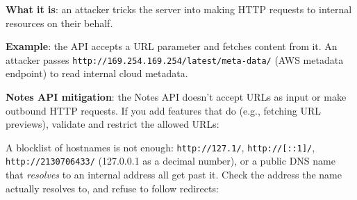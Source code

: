 \textbf{What it is}: an attacker tricks the server into making HTTP requests to internal resources on their behalf.

\textbf{Example}: the API accepts a URL parameter and fetches content from it. An attacker passes \texttt{http:}\allowbreak{}\texttt{/}\allowbreak{}\texttt{/}\allowbreak{}\texttt{169.}\allowbreak{}\texttt{254.}\allowbreak{}\texttt{169.}\allowbreak{}\texttt{254/}\allowbreak{}\texttt{latest/}\allowbreak{}\texttt{meta-}\allowbreak{}\texttt{data/} (AWS metadata endpoint) to read internal cloud metadata.

\textbf{Notes API mitigation}: the Notes API doesn't accept URLs as input or make outbound HTTP requests. If you add features that do (e.g., fetching URL previews), validate and restrict the allowed URLs:

A blocklist of hostnames is not enough: \texttt{http://127.1/}, \texttt{http://{[}::1{]}/}, \texttt{http:/}\allowbreak{}\texttt{/}\allowbreak{}\texttt{2130706433/} (127.0.0.1 as a decimal number), or a public DNS name that \emph{resolves} to an internal address all get past it. Check the address the name actually resolves to, and refuse to follow redirects:

